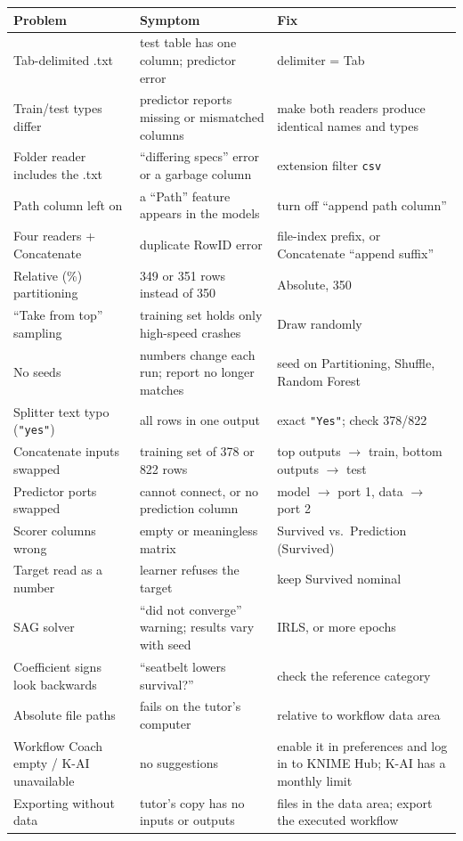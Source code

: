 \documentclass[11pt,a4paper]{article}
\newcommand{\cd}[1]{\texttt{#1}}                     %
\begin{document}
\begin{longtable}{@{}p{4.1cm}p{5.3cm}p{6.2cm}@{}}
\toprule Problem & Symptom & Fix \\ \midrule\endhead
Tab-delimited .txt & test table has one column; predictor error & delimiter = Tab \\
Train/test types differ & predictor reports missing or mismatched columns & make both readers produce identical names and types \\
Folder reader includes the .txt & ``differing specs'' error or a garbage column & extension filter \cd{csv} \\
Path column left on & a ``Path'' feature appears in the models & turn off ``append path column'' \\
Four readers + Concatenate & duplicate RowID error & file-index prefix, or Concatenate ``append suffix'' \\
Relative (\%) partitioning & 349 or 351 rows instead of 350 & Absolute, 350 \\
``Take from top'' sampling & training set holds only high-speed crashes & Draw randomly \\
No seeds & numbers change each run; report no longer matches & seed on Partitioning, Shuffle, Random Forest \\
Splitter text typo (\cd{"yes"}) & all rows in one output & exact \cd{"Yes"}; check 378/822 \\
Concatenate inputs swapped & training set of 378 or 822 rows & top outputs $\rightarrow$ train, bottom outputs $\rightarrow$ test \\
Predictor ports swapped & cannot connect, or no prediction column & model $\rightarrow$ port 1, data $\rightarrow$ port 2 \\
Scorer columns wrong & empty or meaningless matrix & Survived vs.\ Prediction (Survived) \\
Target read as a number & learner refuses the target & keep Survived nominal \\
SAG solver & ``did not converge'' warning; results vary with seed & IRLS, or more epochs \\
Coefficient signs look backwards & ``seatbelt lowers survival?'' & check the reference category \\
Absolute file paths & fails on the tutor's computer & relative to workflow data area \\
Workflow Coach empty / K-AI unavailable & no suggestions & enable it in preferences and log in to KNIME Hub; K-AI has a monthly limit \\
Exporting without data & tutor's copy has no inputs or outputs & files in the data area; export the executed workflow \\
\bottomrule
\end{longtable}
\end{document}
